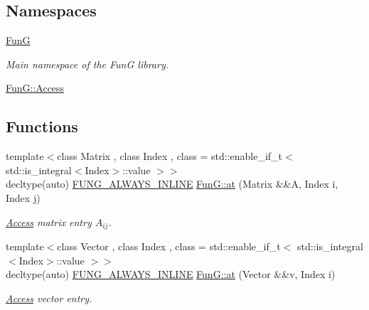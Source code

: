 \subsection*{Namespaces}
\begin{DoxyCompactItemize}
\item 
\hyperlink{namespaceFunG}{Fun\-G}
\begin{DoxyCompactList}\small\item\em Main namespace of the Fun\-G library. \end{DoxyCompactList}\item 
\hyperlink{namespaceFunG_1_1Access}{Fun\-G\-::\-Access}
\end{DoxyCompactItemize}
\subsection*{Functions}
\begin{DoxyCompactItemize}
\item 
{\footnotesize template$<$class Matrix , class Index , class  = std\-::enable\-\_\-if\-\_\-t$<$ std\-::is\-\_\-integral$<$\-Index$>$\-::value $>$$>$ }\\decltype(auto) \hyperlink{macros_8hh_a03b9da186125795e5afa49d0ef1cc32f}{F\-U\-N\-G\-\_\-\-A\-L\-W\-A\-Y\-S\-\_\-\-I\-N\-L\-I\-N\-E} \hyperlink{namespaceFunG_aae631e6149505bdfc0b1c6162b370c7f}{Fun\-G\-::at} (Matrix \&\&A, Index i, Index j)
\begin{DoxyCompactList}\small\item\em \hyperlink{namespaceFunG_1_1Access}{Access} matrix entry $A_{ij}$. \end{DoxyCompactList}\item 
{\footnotesize template$<$class Vector , class Index , class  = std\-::enable\-\_\-if\-\_\-t$<$ std\-::is\-\_\-integral$<$\-Index$>$\-::value $>$$>$ }\\decltype(auto) \hyperlink{macros_8hh_a03b9da186125795e5afa49d0ef1cc32f}{F\-U\-N\-G\-\_\-\-A\-L\-W\-A\-Y\-S\-\_\-\-I\-N\-L\-I\-N\-E} \hyperlink{namespaceFunG_aa40271c9228c5ccee8a4973f27918630}{Fun\-G\-::at} (Vector \&\&v, Index i)
\begin{DoxyCompactList}\small\item\em \hyperlink{namespaceFunG_1_1Access}{Access} vector entry. \end{DoxyCompactList}\end{DoxyCompactItemize}
